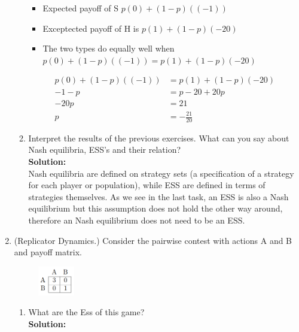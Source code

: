 \documentclass[a4paper]{article}
\begin{document}
\begin{enumerate}
\begin{enumerate}
	    \begin{itemize}
	        \item Expected payoff of S $p(0) + (1 - p)((-1))$
	        \item Exceptected payoff of H is $p(1) + (1 - p)(-20)$
	        \item The two types do equally well when $p(0) + (1 - p)((-1)) = p(1) + (1 - p)(-20)$
	    \end{itemize}
	    
\begin{align*}
    p(0) + (1 - p)((-1)) &= p(1) + (1 - p)(-20)\\
    -1 - p &= p - 20 + 20p\\
    -20p &= 21\\
    p &= -\frac{21}{20}
\end{align*}
		
		\item Interpret the results of the previous exercises. What can you say about Nash equilibria, ESS's and their relation?\\
		\textbf{Solution:}\\	
		
		Nash equilibria are defined on strategy sets (a specification of a strategy for each player or population), while ESS are defined in terms of strategies themselves. As we see in the last task, an ESS is also a Nash equilibrium but this assumption does not hold the other way around, therefore an Nash equilibrium does not need to be an ESS.\vspace{1em}
		
		
		
		
		
	\end{enumerate}
	
	\item(Replicator Dynamics.) Consider the pairwise contest with actions A and B and payoff matrix.
	
		\begin{figure}[H]
	    \centering
  	    \includegraphics[width=0.15\textwidth]{images/task2.PNG}
	    \end{figure}	
	
	
	\begin{enumerate}
		\item What are the Ess of this game?\\
		\textbf{Solution:}\\
		

\end{enumerate}
\end{enumerate}
\end{document}
